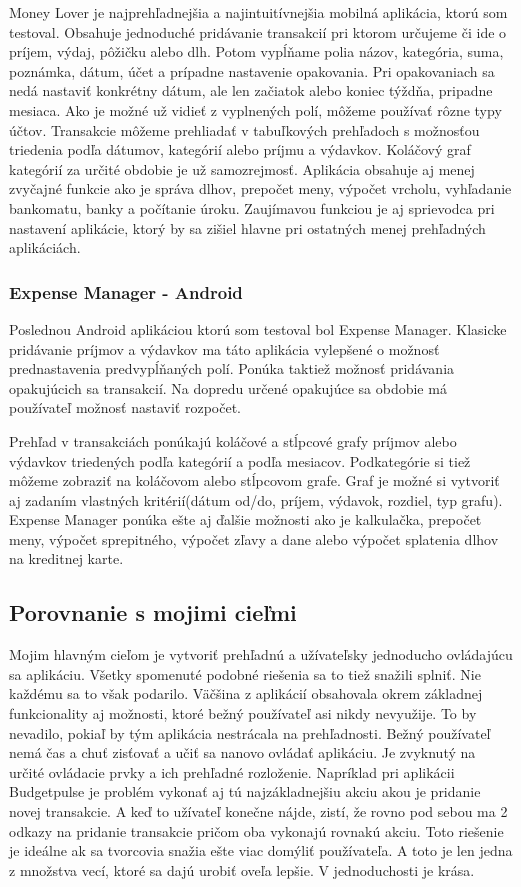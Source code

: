 \documentclass[12pt,oneside]{book}
\begin{document}
Money Lover je najprehľadnejšia a najintuitívnejšia mobilná aplikácia, ktorú som testoval. Obsahuje jednoduché pridávanie transakcií pri ktorom určujeme či ide o príjem, výdaj, pôžičku alebo dlh. Potom vypĺňame polia názov, kategória, suma, poznámka, dátum, účet a prípadne nastavenie opakovania. Pri opakovaniach sa nedá nastaviť konkrétny dátum, ale len začiatok alebo koniec týždňa, pripadne mesiaca. Ako je možné už vidieť z vyplnených polí, môžeme používať rôzne typy účtov. Transakcie môžeme prehliadať v tabuľkových prehľadoch s možnosťou triedenia podľa dátumov, kategórií alebo príjmu a výdavkov. Koláčový graf kategórií za určité obdobie je už samozrejmosť. Aplikácia obsahuje aj menej zvyčajné funkcie ako je správa dlhov, prepočet meny, výpočet vrcholu, vyhľadanie bankomatu, banky a počítanie úroku. Zaujímavou funkciou je aj sprievodca pri nastavení aplikácie, ktorý by sa zišiel hlavne pri ostatných menej prehľadných aplikáciách. 

\subsubsection{Expense Manager - Android \cite{ExpenseManager}\ }

Poslednou Android aplikáciou ktorú som testoval bol Expense Manager. Klasicke pridávanie príjmov a výdavkov ma táto aplikácia vylepšené o možnosť prednastavenia predvypĺňaných polí. Ponúka taktiež možnosť pridávania opakujúcich sa transakcií. Na dopredu určené opakujúce sa obdobie má používateľ možnosť nastaviť rozpočet. 

Prehľad v transakciách ponúkajú koláčové a stĺpcové grafy príjmov alebo výdavkov triedených podľa kategórií a podľa mesiacov. Podkategórie si tiež môžeme zobraziť na koláčovom alebo stĺpcovom grafe. Graf je možné si vytvoriť aj zadaním vlastných kritérií(dátum od/do, príjem, výdavok, rozdiel, typ grafu).
Expense Manager ponúka ešte aj ďalšie možnosti ako je kalkulačka, prepočet meny, výpočet sprepitného, výpočet zľavy a dane alebo výpočet splatenia dlhov na kreditnej karte.

\subsection{Porovnanie s mojimi cieľmi}
Mojim hlavným cieľom je vytvoriť prehľadnú a užívateľsky jednoducho ovládajúcu sa aplikáciu. Všetky spomenuté podobné riešenia sa to tiež snažili splniť. Nie každému sa to však podarilo. Väčšina z aplikácií obsahovala okrem základnej funkcionality aj možnosti, ktoré bežný používateľ asi nikdy nevyužije. To by nevadilo, pokiaľ by tým aplikácia nestrácala na prehľadnosti. Bežný používateľ nemá čas a chuť zisťovať a učiť sa nanovo ovládať aplikáciu. Je zvyknutý na určité ovládacie prvky a ich prehľadné rozloženie. Napríklad pri aplikácii Budgetpulse je problém vykonať aj tú najzákladnejšiu akciu akou je pridanie novej transakcie. A keď to užívateľ konečne nájde, zistí, že rovno pod sebou ma 2 odkazy na pridanie transakcie pričom oba vykonajú rovnakú akciu. Toto riešenie je ideálne ak sa tvorcovia snažia ešte viac domýliť používateľa. A toto je len jedna z množstva vecí, ktoré sa dajú urobiť oveľa lepšie. V jednoduchosti je krása.
\end{document}
